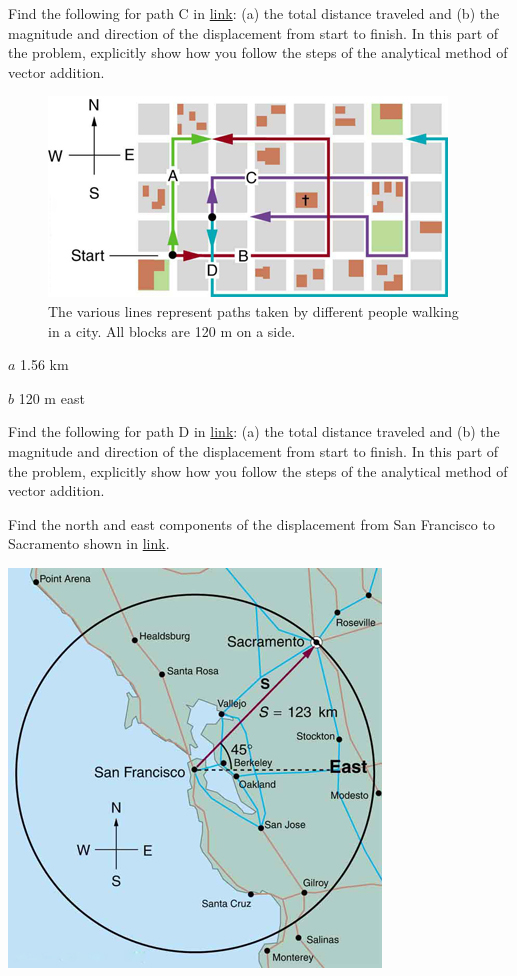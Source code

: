\documentclass[
]{book}
\begin{document}
\hypertarget{fs-id1611479}{}
\leavevmode{}%
Find the following for path C in
\protect\hyperlink{import-auto-id1165298863773}{link}: (a) the
total distance traveled and (b) the magnitude and direction of the
displacement from start to finish. In this part of the problem,
explicitly show how you follow the steps of the analytical method of
vector addition.

\begin{figure}
\hypertarget{import-auto-id1165298863773}{%
\centering
\includegraphics{images/Figure_03_02_20a.jpg}
\caption{The various lines represent paths taken by different people walking in
a city. All blocks are 120 m on a
side.}\label{import-auto-id1165298863773}
}
\end{figure}

\leavevmode{}%
\(a\) 1.56 km

\(b\) 120 m east

\hypertarget{fs-id1876099}{}
\leavevmode{}%
Find the following for path D in
\protect\hyperlink{import-auto-id1165298863773}{link}: (a) the
total distance traveled and (b) the magnitude and direction of the
displacement from start to finish. In this part of the problem,
explicitly show how you follow the steps of the analytical method of
vector addition.

\hypertarget{fs-id1751204}{}
\leavevmode{}%
Find the north and east components of the displacement from San
Francisco to Sacramento shown in
\protect\hyperlink{import-auto-id1165298797444}{link}.

\includegraphics{images/Figure_03_02_19a.jpg}
\end{document}
